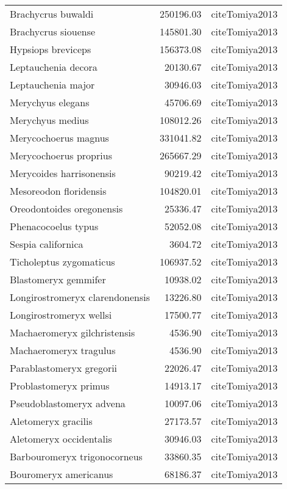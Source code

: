 \begin{table}[ht]
\begin{tabular}{lrl}
  Brachycrus buwaldi & 250196.03 & cite{Tomiya2013} \\ 
  Brachycrus siouense & 145801.30 & cite{Tomiya2013} \\ 
  Hypsiops breviceps & 156373.08 & cite{Tomiya2013} \\ 
  Leptauchenia decora & 20130.67 & cite{Tomiya2013} \\ 
  Leptauchenia major & 30946.03 & cite{Tomiya2013} \\ 
  Merychyus elegans & 45706.69 & cite{Tomiya2013} \\ 
  Merychyus medius & 108012.26 & cite{Tomiya2013} \\ 
  Merycochoerus magnus & 331041.82 & cite{Tomiya2013} \\ 
  Merycochoerus proprius & 265667.29 & cite{Tomiya2013} \\ 
  Merycoides harrisonensis & 90219.42 & cite{Tomiya2013} \\ 
  Mesoreodon floridensis & 104820.01 & cite{Tomiya2013} \\ 
  Oreodontoides oregonensis & 25336.47 & cite{Tomiya2013} \\ 
  Phenacocoelus typus & 52052.08 & cite{Tomiya2013} \\ 
  Sespia californica & 3604.72 & cite{Tomiya2013} \\ 
  Ticholeptus zygomaticus & 106937.52 & cite{Tomiya2013} \\ 
  Blastomeryx gemmifer & 10938.02 & cite{Tomiya2013} \\ 
  Longirostromeryx clarendonensis & 13226.80 & cite{Tomiya2013} \\ 
  Longirostromeryx wellsi & 17500.77 & cite{Tomiya2013} \\ 
  Machaeromeryx gilchristensis & 4536.90 & cite{Tomiya2013} \\ 
  Machaeromeryx tragulus & 4536.90 & cite{Tomiya2013} \\ 
  Parablastomeryx gregorii & 22026.47 & cite{Tomiya2013} \\ 
  Problastomeryx primus & 14913.17 & cite{Tomiya2013} \\ 
  Pseudoblastomeryx advena & 10097.06 & cite{Tomiya2013} \\ 
  Aletomeryx gracilis & 27173.57 & cite{Tomiya2013} \\ 
  Aletomeryx occidentalis & 30946.03 & cite{Tomiya2013} \\ 
  Barbouromeryx trigonocorneus & 33860.35 & cite{Tomiya2013} \\ 
  Bouromeryx americanus & 68186.37 & cite{Tomiya2013} \\ 

\end{tabular}
\end{table}
